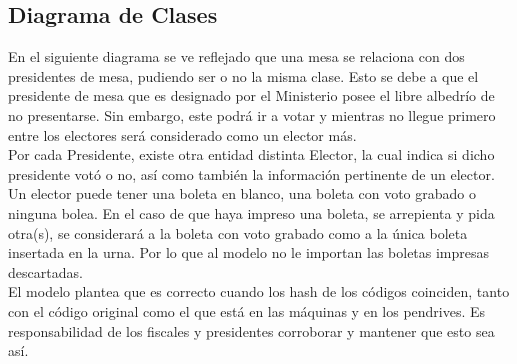 \subsection{Diagrama de Clases}

En el siguiente diagrama se ve reflejado que una mesa se relaciona con dos presidentes de mesa, pudiendo ser o no la misma clase. Esto se debe a que el presidente de mesa que es designado por el Ministerio posee el libre albedr\'io de no presentarse. Sin embargo, este podr\'a ir a votar y mientras no llegue primero entre los electores ser\'a considerado como un elector m\'as.\\


Por cada Presidente, existe otra entidad distinta Elector, la cual indica si dicho presidente vot\'o o no, as\'i como tambi\'en la informaci\'on pertinente de un elector.\\

Un elector puede tener una boleta en blanco, una boleta con voto grabado o ninguna bolea. En el caso de que haya impreso una boleta, se arrepienta y pida otra(s), se considerar\'a a la boleta con voto grabado como a la \'unica boleta insertada en la urna. Por lo que al modelo no le importan las boletas impresas descartadas.\\

El modelo plantea que es correcto cuando los hash de los c\'odigos coinciden, tanto con el c\'odigo original como el que est\'a en las m\'aquinas y en los pendrives. Es responsabilidad de los fiscales y presidentes corroborar y mantener que esto sea as\'i.\\


\newpage

